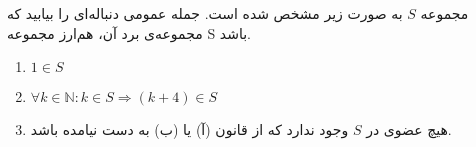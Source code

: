 \begin{PROBLEM}
    \p
    مجموعه
    $S$
    به صورت زیر مشخص شده است. جمله عمومی دنباله‌ای را بیابید که مجموعه‌ی برد آن، هم‌ارز مجموعه S باشد.
    \begin{enumerate}
        \item
        $1 \in S$
            \p
        \item
        $\forall k \in \mathbb{N} : k \in S \Rightarrow (k + 4) \in S$
            \p
        \item
        هیچ عضوی در
        $S$
        وجود ندارد که از قانون (آ) یا (ب) به دست نیامده باشد.
    \end{enumerate}
	
\end{PROBLEM}